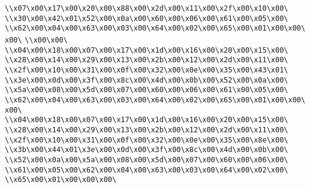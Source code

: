 \verb|\\x07\x00\x17\x00\x20\x00\x88\x00\x2d\x00\x11\x00\x2f\x00\x10\x00\|\newline
\verb|\\x30\x00\x42\x01\x52\x00\x0a\x00\x60\x00\x06\x00\x61\x00\x05\x00\|\newline
\verb|\\x62\x00\x04\x00\x63\x00\x03\x00\x64\x00\x02\x00\x65\x00\x01\x00\x00\x00\|\newline
\verb|\\x00\x00\|\newline
\verb|\\x04\x00\x18\x00\x07\x00\x17\x00\x1d\x00\x16\x00\x20\x00\x15\x00\|\newline
\verb|\\x28\x00\x14\x00\x29\x00\x13\x00\x2b\x00\x12\x00\x2d\x00\x11\x00\|\newline
\verb|\\x2f\x00\x10\x00\x31\x00\x0f\x00\x32\x00\x0e\x00\x35\x00\x43\x01\|\newline
\verb|\\x3e\x00\x0d\x00\x3f\x00\x8c\x00\x4d\x00\x0b\x00\x52\x00\x0a\x00\|\newline
\verb|\\x5a\x00\x08\x00\x5d\x00\x07\x00\x60\x00\x06\x00\x61\x00\x05\x00\|\newline
\verb|\\x62\x00\x04\x00\x63\x00\x03\x00\x64\x00\x02\x00\x65\x00\x01\x00\x00\x00\|\newline
\verb|\\x04\x00\x18\x00\x07\x00\x17\x00\x1d\x00\x16\x00\x20\x00\x15\x00\|\newline
\verb|\\x28\x00\x14\x00\x29\x00\x13\x00\x2b\x00\x12\x00\x2d\x00\x11\x00\|\newline
\verb|\\x2f\x00\x10\x00\x31\x00\x0f\x00\x32\x00\x0e\x00\x35\x00\x8e\x00\|\newline
\verb|\\x3b\x00\x44\x01\x3e\x00\x0d\x00\x3f\x00\x8c\x00\x4d\x00\x0b\x00\|\newline
\verb|\\x52\x00\x0a\x00\x5a\x00\x08\x00\x5d\x00\x07\x00\x60\x00\x06\x00\|\newline
\verb|\\x61\x00\x05\x00\x62\x00\x04\x00\x63\x00\x03\x00\x64\x00\x02\x00\|\newline
\verb|\\x65\x00\x01\x00\x00\x00\|\newline
